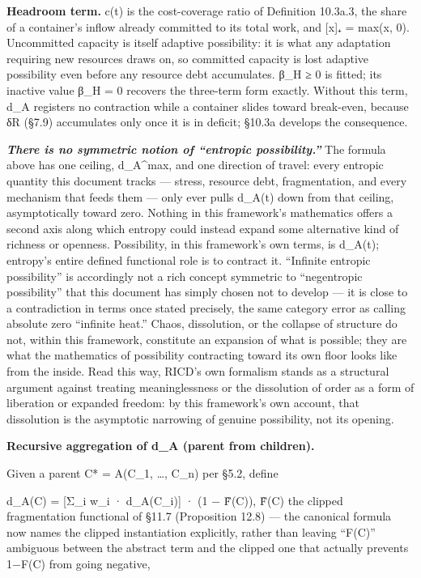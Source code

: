 \documentclass[
]{article}
\begin{document}
\textbf{Headroom term.} c(t) is the cost-coverage ratio of Definition
10.3a.3, the share of a container's inflow already committed to its
total work, and {[}x{]}₊ = max(x, 0). Uncommitted capacity is itself
adaptive possibility: it is what any adaptation requiring new resources
draws on, so committed capacity is lost adaptive possibility even before
any resource debt accumulates. β\_H ≥ 0 is fitted; its inactive value
β\_H = 0 recovers the three-term form exactly. Without this term, d\_A
registers no contraction while a container slides toward break-even,
because δR (§7.9) accumulates only once it is in deficit; §10.3a
develops the consequence.

\emph{\textbf{There is no symmetric notion of ``entropic
possibility.''}} The formula above has one ceiling, d\_A\^{}max, and one
direction of travel: every entropic quantity this document tracks ---
stress, resource debt, fragmentation, and every mechanism that feeds
them --- only ever pulls d\_A(t) down from that ceiling, asymptotically
toward zero. Nothing in this framework's mathematics offers a second
axis along which entropy could instead expand some alternative kind of
richness or openness. Possibility, in this framework's own terms, is
d\_A(t); entropy's entire defined functional role is to contract it.
``Infinite entropic possibility'' is accordingly not a rich concept
symmetric to ``negentropic possibility'' that this document has simply
chosen not to develop --- it is close to a contradiction in terms once
stated precisely, the same category error as calling absolute zero
``infinite heat.'' Chaos, dissolution, or the collapse of structure do
not, within this framework, constitute an expansion of what is possible;
they are what the mathematics of possibility contracting toward its own
floor looks like from the inside. Read this way, RICD's own formalism
stands as a structural argument against treating meaninglessness or the
dissolution of order as a form of liberation or expanded freedom: by
this framework's own account, that dissolution is the asymptotic
narrowing of genuine possibility, not its opening.

\textbf{Recursive aggregation of d\_A (parent from children).}

Given a parent C* = A(C\_1, \ldots, C\_n) per §5.2, define

d\_A(C) = {[}Σ\_i w\_i · d\_A(C\_i){]} · (1 − F̃(C)), F̃(C) the clipped
fragmentation functional of §11.7 (Proposition 12.8) --- the canonical
formula now names the clipped instantiation explicitly, rather than
leaving ``F(C)'' ambiguous between the abstract term and the clipped one
that actually prevents 1−F(C) from going negative,
\end{document}
